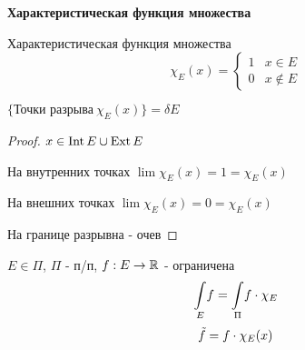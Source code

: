 
\setcounter{lemma}{5}





    {\noindent\large\textbf{Характеристическая функция множества}} \hfill {}

    \begin{definition}
        Характеристическая функция множества 
        \begin{equation*}
            \chi_{E}(x) = 
             \begin{cases}
               1 & x \in E \\
               0 & x \not \in E
             \end{cases}
            \end{equation*}
    \end{definition}


    \begin{lemma}
        $\{\text{Точки разрыва} \ \chi_{E}(x)\} = \delta E$ 
    \end{lemma}

    \begin{proof}
       \par $x \in \operatorname{Int} E \cup \operatorname{Ext} E $
       \par На внутренних точках $\lim \chi_{E}(x) = 1 = \chi_{E}(x)$
       \par На внешних точках $\lim \chi_{E}(x) = 0 = \chi_{E}(x)$
       \bigskip
       \par На границе разрывна - очев

    \end{proof}

    \begin{definition}
        \par $E \in \Pi$, $\Pi$ - п/п, $f: E \rightarrow \mathbb{R}$ - ограничена
        \bigskip
        $$\underset{E}{\int} f = \underset{\Pi}{\int} f\cdot \chi_{E}$$
        \bigskip
        $$\tilde f = f \cdot \chi_{E}(x)$$

    \end{definition}

